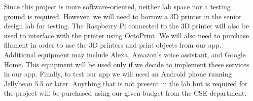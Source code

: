 Since this project is more software-oriented, neither lab space nor a testing ground is required. However, we will need to borrow a 3D printer in the senior design lab for testing. The Raspberry Pi connected to the 3D printer will also be used to interface with the printer using OctoPrint. We will also need to purchase filament in order to use the 3D printers and print objects from our app. Additional equipment may include Alexa, Amazon's voice assistant, and Google Home. This equipment will be used only if we decide to implement these services in our app. Finally, to test our app we will need an Android phone running Jellybean 5.5 or later. Anything that is not present in the lab but is required for the project will be purchased using our given budget from the CSE department. 